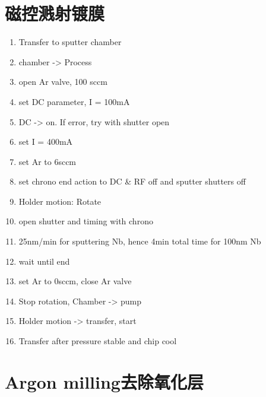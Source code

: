 \section{磁控溅射镀膜} %
\label{sec:磁控溅射镀膜}
    \begin{enumerate}        
        \item Transfer to sputter chamber
        \item chamber -> Process
        \item open Ar valve, 100 sccm
        \item set DC parameter, I = 100mA
        \item DC -> on. If error, try with shutter open
        \item set I = 400mA
        \item set Ar to 6sccm
        \item set chrono end action to DC \& RF off and sputter shutters off
        \item Holder motion: Rotate
        \item open shutter and timing with chrono
        \item 25nm/min for sputtering Nb, hence 4min total time for 100nm Nb
        \item wait until end
        \item set Ar to 0sccm, close Ar valve
        \item Stop rotation, Chamber -> pump
        \item Holder motion -> transfer, start
        \item Transfer after pressure stable and chip cool
    \end{enumerate}

\section{Argon milling去除氧化层} %
\label{sec:argon_milling去除氧化层}


